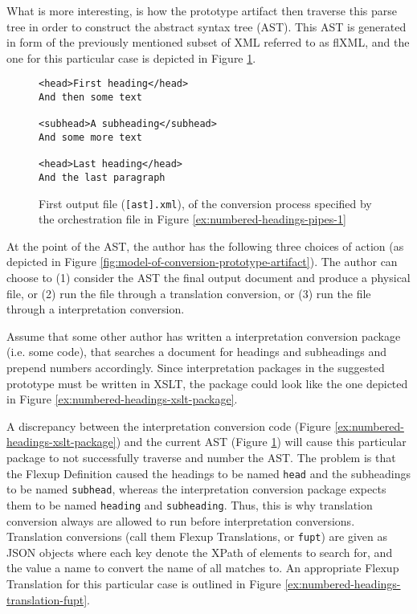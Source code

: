 \documentclass{scrreprt}
\begin{document}
What is more interesting, is how the prototype artifact then traverse this parse tree in order to construct the abstract syntax tree (AST). This AST is generated in form of the previously mentioned subset of XML referred to as flXML, and the one for this particular case is depicted in Figure \ref{ex:numbered-headings-flXML-ast-raw}.


\begin{figure}[h]
\begin{lstlisting}
<head>First heading</head>
And then some text

<subhead>A subheading</subhead>
And some more text

<head>Last heading</head>
And the last paragraph
\end{lstlisting}
\caption{First output file (\texttt{[ast].xml}), of the conversion process specified by the orchestration file in Figure \ref{ex:numbered-headings-pipes-1}}
\label{ex:numbered-headings-flXML-ast-raw}
\end{figure}

At the point of the AST, the author has the following three choices of action (as depicted in Figure \ref{fig:model-of-conversion-prototype-artifact}). The author can choose to (1) consider the AST the final output document and produce a physical file, or (2) run the file through a translation conversion, or (3) run the file through a interpretation conversion.

Assume that some other author has written a interpretation conversion package (i.e. some code), that searches a document for headings and subheadings and prepend numbers accordingly. Since interpretation packages in the suggested prototype must be written in XSLT, the package could look like the one depicted in Figure \ref{ex:numbered-headings-xslt-package}.

A discrepancy between the interpretation conversion code (Figure \ref{ex:numbered-headings-xslt-package}) and the current AST (Figure \ref{ex:numbered-headings-flXML-ast-raw}) will cause this particular package to not successfully traverse and number the AST. The problem is that the Flexup Definition caused the headings to be named \texttt{head} and the subheadings to be named \texttt{subhead}, whereas the interpretation conversion package expects them to be named \texttt{heading} and \texttt{subheading}. Thus, this is why translation conversion always are allowed to run before interpretation conversions. Translation conversions (call them Flexup Translations, or \texttt{fupt}) are given as JSON objects where each key denote the XPath of elements to search for, and the value a name to convert the name of all matches to. An appropriate Flexup Translation for this particular case is outlined in Figure \ref{ex:numbered-headings-translation-fupt}.
\end{document}
